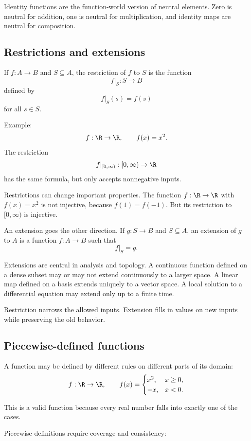 Identity functions are the function-world version of neutral elements. Zero is neutral for addition, one is neutral for multiplication, and identity maps are neutral for composition.

\subsection{Restrictions and extensions}

If $f:A\to B$ and $S\subseteq A$, the restriction of $f$ to $S$ is the function
\[
f|_S:S\to B
\]
defined by
\[
f|_S(s)=f(s)
\]
for all $s\in S$.

Example:
\[
f:\R\to\R,\qquad f(x)=x^2.
\]
The restriction
\[
f|_{[0,\infty)}:[0,\infty)\to\R
\]
has the same formula, but only accepts nonnegative inputs.

Restrictions can change important properties. The function $f:\R\to\R$ with $f(x)=x^2$ is not injective, because $f(1)=f(-1)$. But its restriction to $[0,\infty)$ is injective.

An extension goes the other direction. If $g:S\to B$ and $S\subseteq A$, an extension of $g$ to $A$ is a function $f:A\to B$ such that
\[
f|_S=g.
\]

Extensions are central in analysis and topology. A continuous function defined on a dense subset may or may not extend continuously to a larger space. A linear map defined on a basis extends uniquely to a vector space. A local solution to a differential equation may extend only up to a finite time.

\begin{intuitionbox}
Restriction narrows the allowed inputs. Extension fills in values on new inputs while preserving the old behavior.
\end{intuitionbox}

\subsection{Piecewise-defined functions}

A function may be defined by different rules on different parts of its domain:
\[
f:\R\to\R,\qquad
f(x)=
\begin{cases}
x^2,&x\geq0,\\
-x,&x<0.
\end{cases}
\]

This is a valid function because every real number falls into exactly one of the cases.

Piecewise definitions require coverage and consistency:

